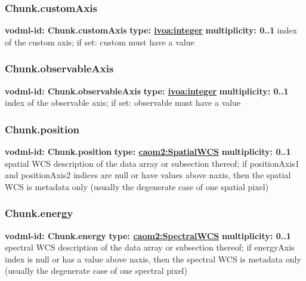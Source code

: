     \subsubsection{Chunk.customAxis}
      \textbf{vodml-id: Chunk.customAxis} \newline
      \textbf{type: \hyperref[sect:ivoa]{ivoa:integer}} \newline
      \textbf{multiplicity: 0..1} \newline
      index of the custom axis; if set: custom must have a value

    \subsubsection{Chunk.observableAxis}
      \textbf{vodml-id: Chunk.observableAxis} \newline
      \textbf{type: \hyperref[sect:ivoa]{ivoa:integer}} \newline
      \textbf{multiplicity: 0..1} \newline
      index of the observable axis; if set: observable must have a value

    \subsubsection{Chunk.position}
      \textbf{vodml-id: Chunk.position} \newline
      \textbf{type: \hyperref[sect:SpatialWCS]{caom2:SpatialWCS}} \newline
      \textbf{multiplicity: 0..1} \newline
      spatial WCS description of the data array or subsection thereof; if positionAxis1 and positionAxis2 indices are null or have values above {naxis}, then the spatial WCS is metadata only (usually the degenerate case of one spatial pixel)

    \subsubsection{Chunk.energy}
      \textbf{vodml-id: Chunk.energy} \newline
      \textbf{type: \hyperref[sect:SpectralWCS]{caom2:SpectralWCS}} \newline
      \textbf{multiplicity: 0..1} \newline
      spectral WCS description of the data array or subsection thereof; if energyAxis index is null or has a value above {naxis}, then the spectral WCS is metadata only (usually the degenerate case of one spectral pixel)

